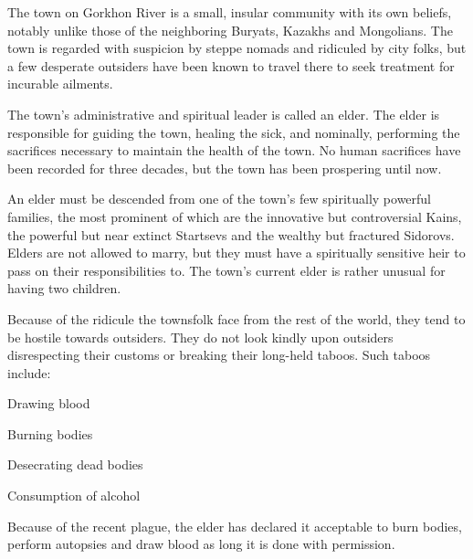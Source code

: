 \documentclass[blue]{Pestilence}
\begin{document}
\name{\bTownElders{}}

The town on Gorkhon River is a small, insular community with its own beliefs, notably unlike those of the neighboring Buryats, Kazakhs and Mongolians. The town is regarded with suspicion by steppe nomads and ridiculed by city folks, but a few desperate outsiders have been known to travel there to seek treatment for incurable ailments.

The town's administrative and spiritual leader is called an elder. The elder is responsible for guiding the town, healing the sick, and nominally, performing the sacrifices necessary to maintain the health of the town. No human sacrifices have been recorded for three decades, but the town has been prospering until now.

An elder must be descended from one of the town's few spiritually powerful families, the most prominent of which are the innovative but controversial Kains, the powerful but near extinct Startsevs and the wealthy but fractured Sidorovs. Elders are not allowed to marry, but they must have a spiritually sensitive heir to pass on their responsibilities to. The town's current elder is rather unusual for having two children.

Because of the ridicule the townsfolk face from the rest of the world, they tend to be hostile towards outsiders. They do not look kindly upon outsiders disrespecting their customs or breaking their long-held taboos. Such taboos include:

\begin{itemz}
	\item Drawing blood
	\item Burning bodies
	\item Desecrating dead bodies
	\item Consumption of alcohol
\end{itemz}

Because of the recent plague, the elder has declared it acceptable to burn bodies, perform autopsies and draw blood as long it is done with \cElder{\their} permission.
\end{document}
